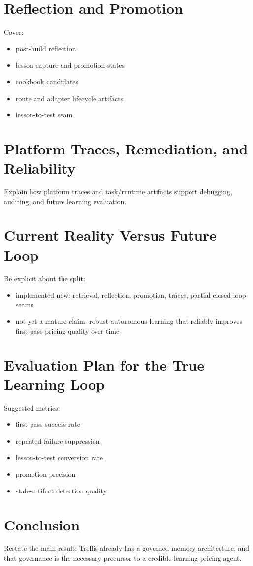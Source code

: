 \documentclass[11pt]{article}
\begin{document}
\section{Reflection and Promotion}

Cover:
\begin{itemize}
    \item post-build reflection
    \item lesson capture and promotion states
    \item cookbook candidates
    \item route and adapter lifecycle artifacts
    \item lesson-to-test seam
\end{itemize}

\section{Platform Traces, Remediation, and Reliability}

Explain how platform traces and task/runtime artifacts support debugging,
auditing, and future learning evaluation.

\section{Current Reality Versus Future Loop}

Be explicit about the split:
\begin{itemize}
    \item implemented now: retrieval, reflection, promotion, traces,
    partial closed-loop seams
    \item not yet a mature claim: robust autonomous learning that reliably
    improves first-pass pricing quality over time
\end{itemize}

\section{Evaluation Plan for the True Learning Loop}

Suggested metrics:
\begin{itemize}
    \item first-pass success rate
    \item repeated-failure suppression
    \item lesson-to-test conversion rate
    \item promotion precision
    \item stale-artifact detection quality
\end{itemize}

\section{Conclusion}

Restate the main result: Trellis already has a governed memory architecture,
and that governance is the necessary precursor to a credible learning pricing
agent.
\end{document}
